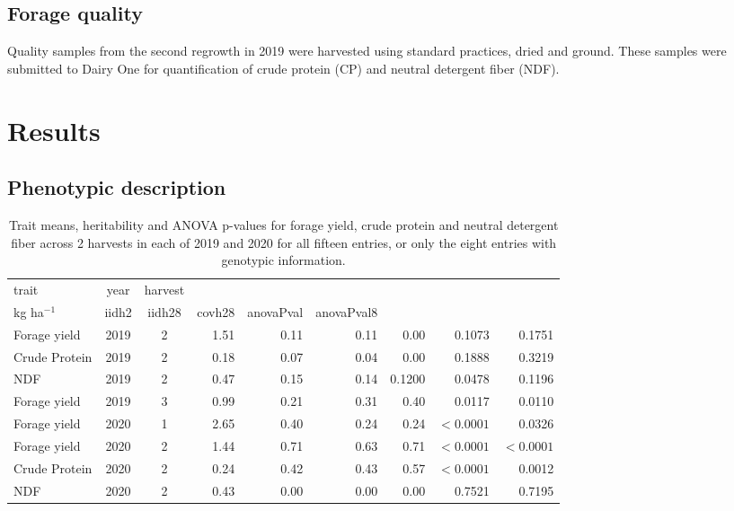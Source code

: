 \documentclass[12pt, letterpaper]{article}
\begin{document}
\subsection{Forage quality}

Quality samples from the second regrowth in 2019 were harvested using standard practices, dried and ground. These samples were submitted to Dairy One for quantification of crude protein (CP) and neutral detergent fiber (NDF). 



\section{Results}

\subsection{Phenotypic description}

\begin{table}[ht]
\caption{Trait means, heritability and ANOVA p-values for forage yield, crude protein and neutral detergent fiber across 2 harvests in each of 2019 and 2020 for all fifteen entries, or only the eight entries with genotypic information.}
\centering
\begin{tabular*}{\hsize}{@{\extracolsep{\fill}}lccrrrrrr}
 trait & year & harvest & \begin{tabular}{c} mean \\ kg ha$^{-1}$ \end{tabular} & iidh2 & iidh28 & covh28 & anovaPval & anovaPval8 \\ 
  \hline
  Forage yield & 2019 & 2           & 1.51  & 0.11 & 0.11 & 0.00 & 0.1073 & 0.1751 \\ 
  Crude Protein & 2019 & 2           & 0.18 & 0.07 & 0.04 & 0.00 & 0.1888 & 0.3219 \\ 
  NDF & 2019 & 2 & 0.47 & 0.15 & 0.14 & 0.1200 & 0.0478 & 0.1196 \\ 
  Forage yield & 2019 & 3            & 0.99 & 0.21 & 0.31 & 0.40 & 0.0117 & 0.0110 \\ 
  Forage yield & 2020 & 1            & 2.65 & 0.40 & 0.24 & 0.24 & $< 0.0001$ & 0.0326 \\ 
  Forage yield & 2020 & 2            & 1.44 & 0.71 & 0.63 & 0.71 & $< 0.0001$ & $< 0.0001$ \\ 
  Crude Protein & 2020 & 2           & 0.24 & 0.42 & 0.43 & 0.57 & $< 0.0001$ & 0.0012 \\ 
  NDF & 2020 & 2 & 0.43 & 0.00 & 0.00 & 0.00 & 0.7521 & 0.7195 \\ 
   \hline
\end{tabular*}
\end{table}
\end{document}
